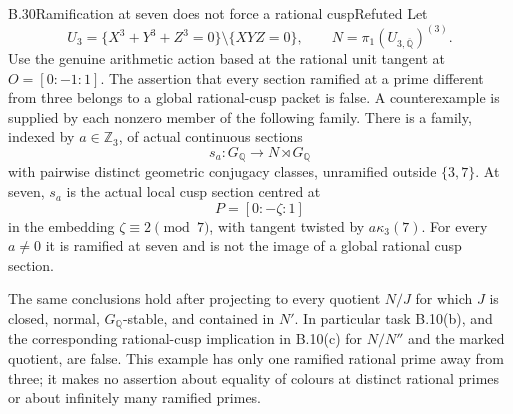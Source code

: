 \begin{statement}{B.30}{Ramification at seven does not force a rational cusp}{Refuted}
Let
\[
 U_3=\{X^3+Y^3+Z^3=0\}\setminus\{XYZ=0\},\qquad
 N=\pi_1(U_{3,\overline{\mathbb Q}})^{(3)}.
\]
Use the genuine arithmetic action based at the rational unit
tangent at $O=[0:-1:1]$.  The assertion that every section
ramified at a prime different from three belongs to a global
rational-cusp packet is false.  A counterexample is supplied
by each nonzero member of the following family.
There is a family, indexed by
$a\in\mathbb Z_3$, of actual continuous sections
\[
                    s_a:G_{\mathbb Q}\longrightarrow
                                  N\rtimes G_{\mathbb Q}
\]
with pairwise distinct geometric conjugacy classes, unramified
outside $\{3,7\}$.  At seven, $s_a$ is the actual local cusp
section centred at
\[
                         P=[0:-\zeta:1]
\]
in the embedding $\zeta\equiv2\pmod7$, with tangent twisted by
$a\kappa_3(7)$.  For every $a\ne0$ it is ramified at seven
and is not the image of a global rational cusp section.

The same conclusions hold after projecting to every quotient
$N/J$ for which $J$ is closed, normal, $G_{\mathbb Q}$-stable,
and contained in $N'$.  In particular task B.10(b), and the
corresponding rational-cusp implication in B.10(c) for
$N/N''$ and the marked quotient, are false.  This example has
only one ramified rational prime away from three; it makes
no assertion about equality of colours at distinct rational
primes or about infinitely many ramified primes.
\end{statement}

